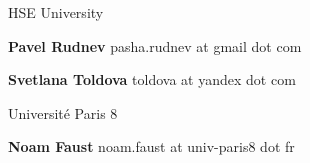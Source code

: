 \begin{cventries}

 \cventry
    {HSE University} %
    {} %
    {} %
    {} %
    {
      \begin{cvitems} %
        \item {\textbf{Pavel Rudnev} \hfill {pasha.rudnev at gmail dot com}}
        \item {\textbf{Svetlana Toldova} \hfill {toldova at yandex dot com}}
      \end{cvitems}
    }

 \cventry
    {Université Paris 8} %
    {} %
    {} %
    {} %
    {
      \begin{cvitems} %
        \item {\textbf{Noam Faust} \hfill {noam.faust at univ-paris8 dot fr}}
      \end{cvitems}
    }

\end{cventries}